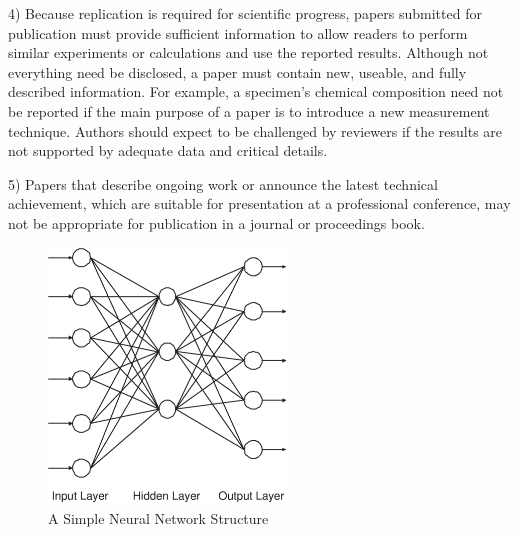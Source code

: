 \documentclass[journal]{IAENGtran}
\begin{document}
4) Because replication is required for scientific progress, papers
submitted for publication must provide sufficient information to
allow readers to perform similar experiments or calculations and use
the reported results. Although not everything need be disclosed, a
paper must contain new, useable, and fully described information.
For example, a specimen's chemical composition need not be reported
if the main purpose of a paper is to introduce a new measurement
technique. Authors should expect to be challenged by reviewers if
the results are not supported by adequate data and critical details.

5)  Papers that describe ongoing work or announce the latest
technical achievement, which are suitable for presentation at a
professional conference, may not be appropriate for publication in a
journal or proceedings book.



%
%

\begin{figure}[!t]
\centering
\includegraphics[width=2.5in]{NEURAL_NETWORK}
\caption{A Simple Neural Network Structure}
\label{fig_nn}
\end{figure}
\end{document}
